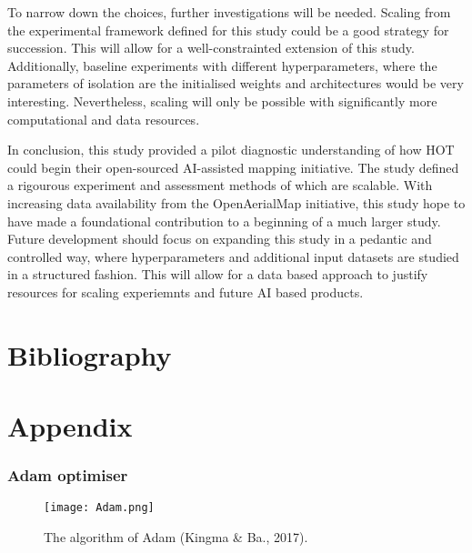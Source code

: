 \documentclass[11pt, a4paper, twoside]{report}
\begin{document}
To narrow down the choices, further investigations will be needed. Scaling from the experimental framework defined for this study could be a good strategy for succession. This will allow for a well-constrainted extension of this study. Additionally, baseline experiments with different hyperparameters, where the parameters of isolation are the initialised weights and architectures would  be very interesting. Nevertheless, scaling will only be possible with significantly more computational and data resources.\\\par

In conclusion, this study provided a pilot diagnostic understanding of how HOT could begin their open-sourced AI-assisted mapping initiative. The study defined a rigourous experiment and assessment methods of which are scalable. With increasing data availability from the OpenAerialMap initiative, this study hope to have made a foundational contribution to a beginning of a much larger study. Future development should focus on expanding this study in a pedantic and controlled way, where hyperparameters and additional input datasets are studied in a structured fashion. This will allow for a data based approach to justify resources for scaling experiemnts and future AI based products.\\\par

\newpage

\chapter{Bibliography}\label{Bib}

\printbibliography

\newpage

\chapter{Appendix}\label{Appen}

\subsection{Adam optimiser}\label{Adam}

\begin{figure}[H]
  \centering
  \texttt{[image: Adam.png]}
  \caption{The algorithm of Adam (Kingma \& Ba., 2017).}
  \label{app:Adam}
\end{figure}
\end{document}
